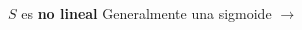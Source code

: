 \begin{myframe}
\centering


\vspace{-35px}
\begin{columns}

\begin{column}{0.5\textwidth}
\vspace{70px}
\begin{block}{ \centering $S$ es \textbf{no lineal}}
\centering
\pause
Generalmente una sigmoide $\rightarrow$
\end{block}
\end{column}

\begin{column}{0.5\textwidth}
\end{column}

\end{columns}
\end{myframe}
